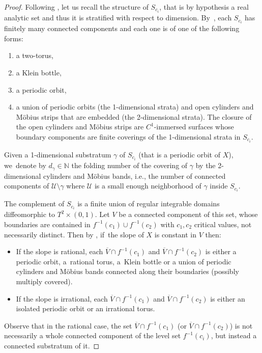 \documentclass[11pt]{article}
\newcommand{\ie}{i.e.,\xspace}
\theoremstyle{definition}
\begin{document}
\begin{proof}
Following \cite{CV2}, let us recall the structure of $S_{c_i}$, that is by hypothesis a real analytic set and thus it is stratified with respect to dimension. By~\cite[Prop.\,2.6]{CV2}, each $S_{c_i}$ has finitely many connected components and each one is of one of the following forms:
\begin{enumerate}
\item a two-torus,
\item a Klein bottle,
\item a periodic orbit,
\item a union of periodic orbits (the 1-dimensional strata) and open cylinders and Möbius strips that are embedded (the 2-dimensional strata). The closure of the open cylinders and Möbius strips are $C^1$-immersed surfaces whose boundary components are finite coverings of the 1-dimensional strata in $S_{c_i}$.
\end{enumerate}
Given a 1-dimensional substratum $\gamma$ of $S_{c_i}$ (that is a periodic orbit of $X$), we~denote by $d_{\gamma}\in \mathbb{N}$ the folding number of the covering of $\gamma$ by the 2-dimensional cylinders and Möbius bands, \ie the number of connected components of $\mathcal{U}\setminus \gamma$ where $\mathcal{U}$ is a small enough neighborhood of $\gamma$ inside $S_{c_i}$.

The complement of $S_{c_i}$ is a finite union of regular integrable domains diffeomorphic to $T^2\times (0,1)$. Let $V$ be a connected component of this set, whose boundaries are contained in $f^{-1}(c_1)\cup f^{-1}(c_2)$ with $c_1,c_2$ critical values, not necessarily distinct. Then by \cite[Lem.\,3.4]{CV2}, if~the slope of $X$ is constant in $V$ then:
\begin{itemize}
\item
If the slope is rational, each $\overline{V}\cap f^{-1}(c_1)$ and $\overline{V}\cap f^{-1}(c_2)$ is either a periodic orbit, a~rational torus, a~Klein bottle or a union of periodic cylinders and Möbius bands connected along their boundaries (possibly multiply covered).
\item
If the slope is irrational, each $\overline{V}\cap f^{-1}(c_1)$ and $\overline{V}\cap f^{-1}(c_2)$ is either an isolated periodic orbit or an irrational torus.
\end{itemize}
Observe that in the rational case, the set $\overline{V}\cap f^{-1}(c_1)$ (or $\overline{V}\cap f^{-1}(c_2)$) is not necessarily a whole connected component of the level set $f^{-1}(c_i)$, but instead a connected substratum of it.


\end{proof}
\end{document}
